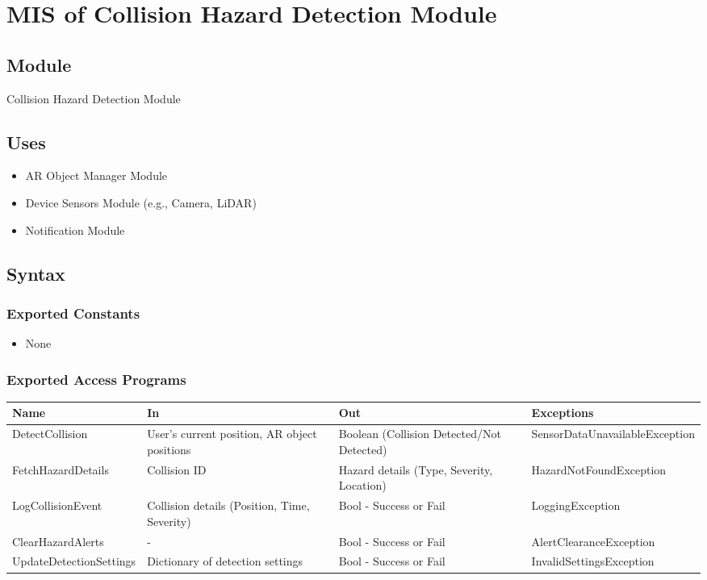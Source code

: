 \documentclass[12pt, titlepage]{article}
\begin{document}
\newpage


\section{MIS of Collision Hazard Detection Module} \label{Module_CollisionHazardDetection}

\subsection{Module}

Collision Hazard Detection Module

\subsection{Uses}

\begin{itemize}
    \item AR Object Manager Module
    \item Device Sensors Module (e.g., Camera, LiDAR)
    \item Notification Module
\end{itemize}

\subsection{Syntax}

\subsubsection{Exported Constants}

\begin{itemize}
    \item None
\end{itemize}

\subsubsection{Exported Access Programs}

\begin{center}
\begin{tabular}{p{4.2cm} p{3cm} p{3cm} p{4cm}}
\hline
\textbf{Name} & \textbf{In} & \textbf{Out} & \textbf{Exceptions} \\
\hline
DetectCollision & User’s current position, AR object positions & Boolean (Collision Detected/Not Detected) & SensorDataUnavailableException \\
\hline
FetchHazardDetails & Collision ID & Hazard details (Type, Severity, Location) & HazardNotFoundException \\
\hline
LogCollisionEvent & Collision details (Position, Time, Severity) & Bool - Success or Fail & LoggingException \\
\hline
ClearHazardAlerts & - & Bool - Success or Fail & AlertClearanceException \\
\hline
UpdateDetectionSettings & Dictionary of detection settings & Bool - Success or Fail & InvalidSettingsException \\
\hline
\end{tabular}
\end{center}
\end{document}
